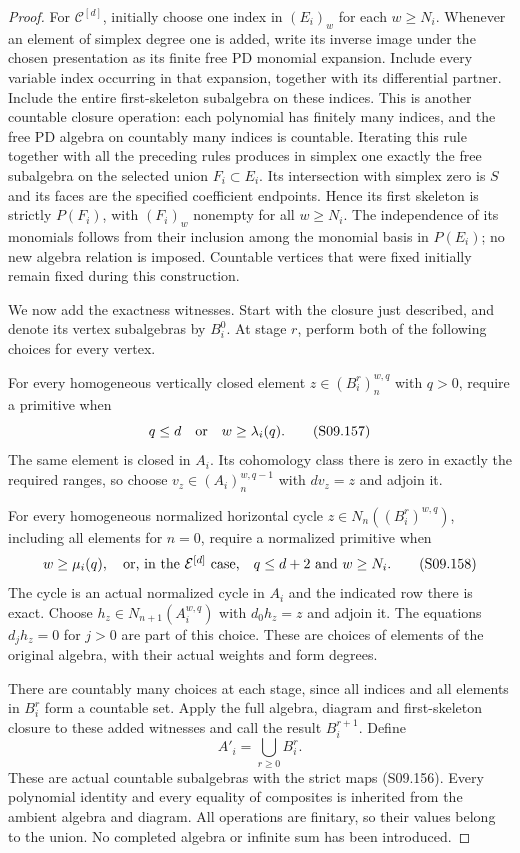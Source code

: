 \begin{proof}
For $\mathcal C^{[d]}$, initially choose one index in $(E_i)_w$
for each $w\geq N_i$. Whenever an element of simplex degree one
is added, write its inverse image under the chosen presentation
as its finite free PD monomial expansion. Include every variable
index occurring in that expansion, together with its differential
partner. Include the entire first-skeleton subalgebra on these
indices. This is another countable closure operation: each
polynomial has finitely many indices, and the free PD algebra on
countably many indices is countable. Iterating this rule together
with all the preceding rules produces in simplex one exactly
the free subalgebra on the selected union $F_i\subset E_i$.
Its intersection with simplex zero is $S$ and its faces are the
specified coefficient endpoints. Hence its first skeleton is
strictly $P(F_i)$, with $(F_i)_w$ nonempty for all $w\geq N_i$.
The independence of its monomials follows from their inclusion
among the monomial basis in $P(E_i)$; no new algebra relation
is imposed. Countable vertices that were fixed initially remain
fixed during this construction.

We now add the exactness witnesses. Start with the closure just
described, and denote its vertex subalgebras by $B_i^0$. At stage
$r$, perform both of the following choices for every vertex.

For every homogeneous vertically closed element
$z\in(B_i^r)_n^{w,q}$ with $q>0$, require a primitive when
\[
                 q\leq d\quad\hbox{or}\quad w\geq\lambda_i(q).
 \tag{S09.157}
\]
The same element is closed in $A_i$. Its cohomology class there
is zero in exactly the required ranges, so choose
$v_z\in(A_i)_n^{w,q-1}$ with $dv_z=z$ and adjoin it.

For every homogeneous normalized horizontal cycle
$z\in N_n((B_i^r)^{w,q})$, including all elements for $n=0$,
require a normalized primitive when
\[
 w\geq\mu_i(q),\quad\hbox{or, in the $\mathcal E^{[d]}$ case,}
 \quad q\leq d+2\ \hbox{and}\ w\geq N_i.
 \tag{S09.158}
\]
The cycle is an actual normalized cycle in $A_i$ and the
indicated row there is exact. Choose
$h_z\in N_{n+1}(A_i^{w,q})$ with $d_0h_z=z$ and adjoin it.
The equations $d_jh_z=0$ for $j>0$ are part of this choice.
These are choices of elements of the original algebra, with
their actual weights and form degrees.

There are countably many choices at each stage, since all
indices and all elements in $B_i^r$ form a countable set.
Apply the full algebra, diagram and first-skeleton closure to
these added witnesses and call the result $B_i^{r+1}$.
Define
\[
                         A'_i=\bigcup_{r\geq0} B_i^r.
 \tag{S09.159}
\]
These are actual countable subalgebras with the strict maps
(S09.156). Every polynomial identity and every equality of
composites is inherited from the ambient algebra and diagram.
All operations are finitary, so their values belong to the
union. No completed algebra or infinite sum has been introduced.


\end{proof}
